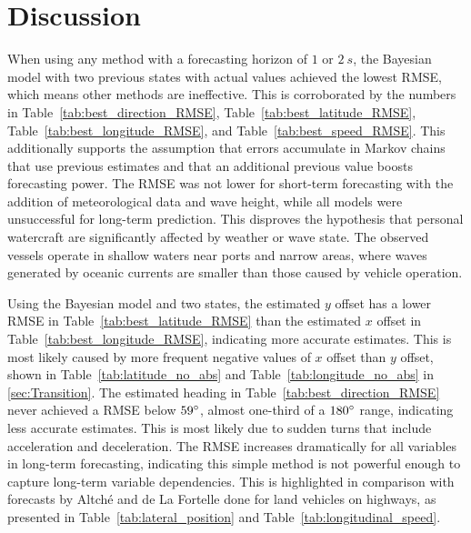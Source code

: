 \documentclass[preprint,12pt]{elsarticle}
\begin{document}
\section{Discussion}
\label{sec:Discussion}

When using any method with a forecasting horizon of $1$ or $2 \ s$, the Bayesian model with two previous states with actual values achieved the lowest RMSE, which means other methods are ineffective. This is corroborated by the numbers in Table~\ref{tab:best_direction_RMSE}, Table~\ref{tab:best_latitude_RMSE}, Table~\ref{tab:best_longitude_RMSE}, and Table~\ref{tab:best_speed_RMSE}. This additionally supports the assumption that errors accumulate in Markov chains that use previous estimates and that an additional previous value boosts forecasting power. The RMSE was not lower for short-term forecasting with the addition of meteorological data and wave height, while all models were unsuccessful for long-term prediction. This disproves the hypothesis that personal watercraft are significantly affected by weather or wave state. The observed vessels operate in shallow waters near ports and narrow areas, where waves generated by oceanic currents are smaller than those caused by vehicle operation. 

Using the Bayesian model and two states, the estimated $y$ offset has a lower RMSE in Table~\ref{tab:best_latitude_RMSE} than the estimated $x$ offset in Table~\ref{tab:best_longitude_RMSE}, indicating more accurate estimates. This is most likely caused by more frequent negative values of $x$ offset than $y$ offset, shown in Table~\ref{tab:latitude_no_abs}  and Table~\ref{tab:longitude_no_abs} in \ref{sec:Transition}. The estimated heading in Table~\ref{tab:best_direction_RMSE} never achieved a RMSE below $59\degree$, almost one-third of a $180\degree$ range, indicating less accurate estimates. This is most likely due to sudden turns that include acceleration and deceleration. The RMSE increases dramatically for all variables in long-term forecasting, indicating this simple method is not powerful enough to capture long-term variable dependencies. This is highlighted in comparison with forecasts by Altché and de La Fortelle done for land vehicles on highways, as presented in Table~\ref{tab:lateral_position} and Table~\ref{tab:longitudinal_speed}.
\end{document}
